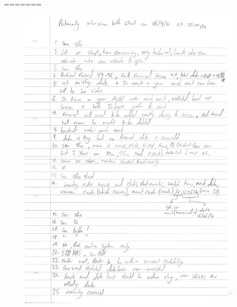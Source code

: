 =======
\begin{figure}[H]
    \includegraphics[width=\textwidth]{./interview/InterviewNotesPage1.pdf}
\end{figure}

